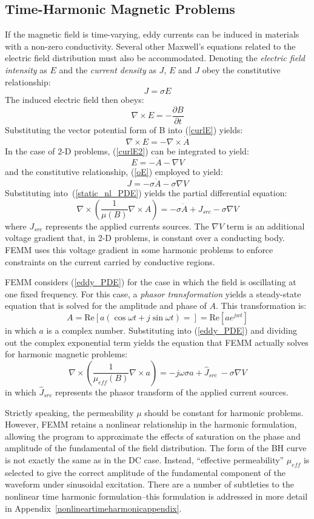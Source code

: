 \documentclass[12pt]{report}
\newcommand{\be}{\begin{equation}}
\newcommand{\ee}{\end{equation}}
\newcommand{\Curl}{\nabla \times}
\begin{document}
\subsection{Time-Harmonic Magnetic Problems}

If the magnetic field is time-varying, eddy currents can be induced
in materials with a non-zero conductivity. Several other Maxwell's
equations related to the electric field distribution must also be
accommodated. Denoting the {\em electric field intensity} as $E$
and the {\em current density} as $J$, $E$ and $J$ obey the
constitutive relationship:
\be \label{oE} J = \sigma E \ee
The induced electric field then obeys:
\be \label{curlE} \Curl E = -\frac{\partial B}{\partial t} \ee
Substituting the vector potential form of B into (\ref{curlE})
yields:
\be \label{curlE2} \Curl E = - \Curl \dot{A}\ee
In the case of 2-D problems, (\ref{curlE2}) can be integrated to
yield:
\be E = -\dot{A} - \nabla V \ee
and the constitutive relationship, (\ref{oE}) employed to yield:
\be J = - \sigma \dot{A} - \sigma \nabla V \ee
Substituting into~(\ref{static_nl_PDE}) yields the partial
differential equation:
\be \label{eddy_PDE} \nabla \times \left( \frac{1}{\mu(B)} \nabla \times A \right) =  - \sigma \dot{A} + J_{src} - \sigma \nabla V \ee
where $J_{src}$ represents the applied currents sources.  The
$\nabla V$ term is an additional voltage gradient that, in 2-D
problems, is constant over a conducting body.  FEMM uses this
voltage gradient in some harmonic problems to enforce constraints
on the current carried by conductive regions.

FEMM considers (\ref{eddy_PDE}) for the case in which the field is
oscillating at one fixed frequency.  For this case, a {\em phasor
transformation} \cite{Hoole} yields a steady-state equation that is
solved for the amplitude and phase of $A$.  This transformation is:
\be \label{phasor_transformation} A= \mbox{Re}\left[a (\cos \omega t + j \sin \omega t) = \right]
= \mbox{Re} \left[ a e^{j w t} \right] \ee
in which $a$ is a complex number.  Substituting into
(\ref{eddy_PDE}) and dividing out the complex exponential term
yields the equation that FEMM actually solves for harmonic magnetic
problems:
\be \label{harmonic_PDE} \nabla \times \left( \frac{1}{\mu_{eff}(B)} \nabla \times a \right) = - j \omega \sigma a + \hat{J}_{src} \ - \sigma \nabla V\ee
in which $\hat{J}_{src}$ represents the phasor transform of the
applied current sources.

Strictly speaking, the permeability $\mu$ should be constant for
harmonic problems. However, FEMM retains a nonlinear relationship
in the harmonic formulation, allowing the program to approximate
the effects of saturation on the phase and amplitude of the
fundamental of the field distribution. The form of the BH curve is
not exactly the same as in the DC case. Instead, ``effective
permeability'' $\mu_{eff}$ is selected to give the correct
amplitude of the fundamental component of the waveform under
sinusoidal excitation. There are a number of subtleties to the
nonlinear time harmonic formulation--this formulation is addressed
in more detail in Appendix~\ref{nonlineartimeharmonicappendix}.
\end{document}
